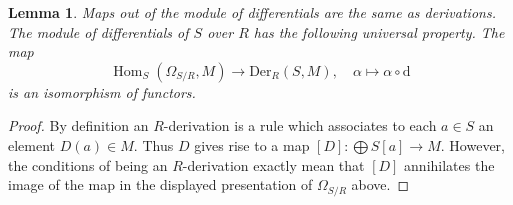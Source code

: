 \documentclass[10pt,a4paper]{amsart}
\newenvironment{slogan}{\comment}{\endcomment}
\theoremstyle{plain}
\newtheorem{lemma}[subsection]{Lemma}
\theoremstyle{definition}
\theoremstyle{remark}
\numberwithin{equation}{subsection}
\def\Hom{\mathop{\mathrm{Hom}}\nolimits}
\begin{document}
\begin{lemma}
\label{lemma-universal-omega}
\begin{slogan}
Maps out of the module of differentials are the same as derivations.
\end{slogan}
The module of differentials of $S$ over $R$ has the following
universal property. The map
$$
\Hom_S(\Omega_{S/R}, M)
\longrightarrow
\text{Der}_R(S, M), \quad
\alpha
\longmapsto
\alpha \circ \text{d}
$$
is an isomorphism of functors.
\end{lemma}

\begin{proof}
By definition an $R$-derivation is a rule which associates
to each $a \in S$ an element $D(a) \in M$. Thus $D$ gives
rise to a map $[D] : \bigoplus S[a] \to M$. However, the conditions
of being an $R$-derivation exactly mean that $[D]$ annihilates
the image of the map in the displayed presentation of
$\Omega_{S/R}$ above.
\end{proof}
\end{document}
